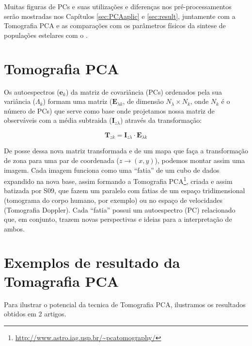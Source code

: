 Muitas figuras de PCs e suas utilizações e diferenças nos pré-processamentos serão mostradas nos Capítulos
\ref{sec:PCAaplic} e \ref{sec:result}, juntamente com a Tomografia PCA e as comparações com os parâmetros físicos da
sintese de populações estelares com o \starlight.


\section{Tomografia PCA}
\label{sec:PCAeTomoPCA:TomoPCA}

Os autoespectros ($\mathbf{e}_k$) da matriz de covariância (PCs) ordenados pela sua variância ($\Lambda_k$) formam uma matriz
($\mathbf{E}{}_{\lambda k}$, de dimensão $N_\lambda \times N_k$, onde $N_k$ é o número de PCs) que serve como base onde
projetamos nossa matriz de observáveis com a média subtraida ($\mathbf{I}{}_{z \lambda}$) através da transformação:

\begin{equation}
	\label{eq:TomoPCA:tomogram2D}
	\mathbf{T}{}_{z k} = \mathbf{I}{}_{z \lambda} \cdot \mathbf{E}{}_{\lambda k}
\end{equation}

De posse dessa nova matriz transformada e de um mapa que faça a transformação de zona para uma par de coordenada ($z \to
(x, y)$), podemos montar assim uma imagem. Cada imagem funciona como uma ``fatia'' de um cubo de dados expandido na nova
base, assim formando a Tomografia PCA\footnote{\url{http://www.astro.iag.usp.br/~pcatomography/}}, criada e assim
batizada por S09, que fazem um paralelo com fatias de um espaço tridimensional (tomograma do corpo humano, por exemplo)
ou no espaço de velocidades (Tomografia Doppler). Cada ``fatia'' possui um autoespectro (PC) relacionado que, em
conjunto, trazem novas perspectivas e ideias para a interpretação de ambos.

\section{Exemplos de resultado da Tomagrafia PCA}

Para ilustrar o potencial da tecnica de Tomografia PCA, ilustramos os resultados obtidos em 2 artigos.

